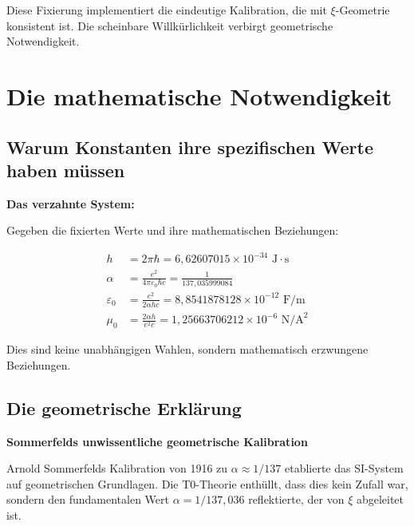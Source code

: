 \documentclass[12pt,a4paper]{article}
\begin{document}
	\begin{insight}
		Diese Fixierung implementiert die eindeutige Kalibration, die mit $\xi$-Geometrie konsistent ist. Die scheinbare Willk{\"u}rlichkeit verbirgt geometrische Notwendigkeit.
	\end{insight}
	
	\section{Die mathematische Notwendigkeit}
	
	\subsection{Warum Konstanten ihre spezifischen Werte haben m{\"u}ssen}
	
	\begin{derivation}
		\textbf{Das verzahnte System:}
		
		Gegeben die fixierten Werte und ihre mathematischen Beziehungen:
		
		\begin{align}
			h &= 2\pi\hbar = 6{,}62607015 \times 10^{-34} \text{ J}\cdot\text{s} \\
			\alpha &= \frac{e^2}{4\pi\varepsilon_0\hbar c} = \frac{1}{137{,}035999084} \\
			\varepsilon_0 &= \frac{e^2}{2\alpha h c} = 8{,}8541878128 \times 10^{-12} \text{ F/m} \\
			\mu_0 &= \frac{2\alpha h}{e^2 c} = 1{,}25663706212 \times 10^{-6} \text{ N/A}^2
		\end{align}
		
		Dies sind keine unabh{\"a}ngigen Wahlen, sondern mathematisch erzwungene Beziehungen.
	\end{derivation}
	
	\subsection{Die geometrische Erkl{\"a}rung}
	
	\begin{historical}
		\textbf{Sommerfelds unwissentliche geometrische Kalibration}
		
		Arnold Sommerfelds Kalibration von 1916 zu $\alpha \approx 1/137$ etablierte das SI-System auf geometrischen Grundlagen. Die T0-Theorie enth{\"u}llt, dass dies kein Zufall war, sondern den fundamentalen Wert $\alpha = 1/137{,}036$ reflektierte, der von $\xi$ abgeleitet ist.
	\end{historical}
	
\end{document}
